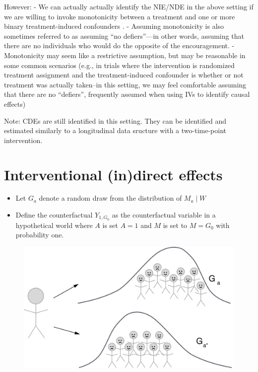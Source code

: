 \documentclass[
  12pt,
]{book}
\providecommand{\tightlist}{%
  \setlength{\itemsep}{0pt}\setlength{\parskip}{0pt}}
\theoremstyle{definition}
\theoremstyle{definition}
\theoremstyle{definition}
\newcommand{\1}{\mathbbm{1}}
\begin{document}
However:
- We can actually actually identify the NIE/NDE in the above setting if we are
willing to invoke monotonicity between a treatment and one or more binary
treatment-induced confounders \citep{tchetgen2014identification}.
- Assuming monotonicity is also sometimes referred to as assuming ``no
defiers''---in other words, assuming that there are no individuals who would
do the opposite of the encouragement.
- Monotonicity may seem like a restrictive assumption, but may be reasonable in
some common scenarios (e.g., in trials where the intervention is randomized
treatment assignment and the treatment-induced confounder is whether or not
treatment was actually taken--in this setting, we may feel comfortable
assuming that there are no ``defiers'', frequently assumed when using IVs to
identify causal effects)

Note: CDEs are still identified in this setting. They can be identified and
estimated similarly to a longitudinal data sructure with a two-time-point
intervention.

\hypertarget{interventional-indirect-effects}{%
\section{Interventional (in)direct effects}\label{interventional-indirect-effects}}

\begin{itemize}
\tightlist
\item
  Let \(G_a\) denote a random draw from the distribution of \(M_a \mid W\)
\item
  Define the counterfactual \(Y_{1,G_0}\) as the counterfactual
  variable in a hypothetical world where \(A\) is set \(A=1\) and \(M\) is
  set to \(M=G_0\) with probability one.
\end{itemize}

\begin{figure}

{\centering \includegraphics[width=0.5\linewidth]{img/graphic4b} 

}

\end{figure}
\end{document}
